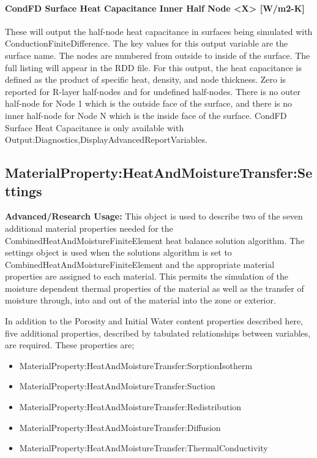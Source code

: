 \paragraph{CondFD Surface Heat Capacitance Inner Half Node \textless{}X\textgreater{} {[}W/m2-K{]}}\label{condfd-surface-heat-capacitance-inner-half-node-x-wm2-k}

These will output the half-node heat capacitance in surfaces being simulated with ConductionFiniteDifference. The key values for this output variable are the surface name. The nodes are numbered from outside to inside of the surface. The full listing will appear in the RDD file. For this output, the heat capacitance is defined as the product of specific heat, density, and node thickness. Zero is reported for R-layer half-nodes and for undefined half-nodes. There is no outer half-node for Node 1 which is the outside face of the surface, and there is no inner half-node for Node N which is the inside face of the surface. CondFD Surface Heat Capacitance is only available with Output:Diagnostics,DisplayAdvancedReportVariables.

\subsection{MaterialProperty:HeatAndMoistureTransfer:Settings}\label{materialpropertyheatandmoisturetransfersettings}

\textbf{Advanced/Research Usage:} This object is used to describe two of the seven additional material properties needed for the CombinedHeatAndMoistureFiniteElement heat balance solution algorithm. The settings object is used when the solutions algorithm is set to CombinedHeatAndMoistureFiniteElement and the appropriate material properties are assigned to each material. This permits the simulation of the moisture dependent thermal properties of the material as well as the transfer of moisture through, into and out of the material into the zone or exterior.

In addition to the Porosity and Initial Water content properties described here, five additional properties, described by tabulated relationships between variables, are required. These properties are;

\begin{itemize}
\item
  MaterialProperty:HeatAndMoistureTransfer:SorptionIsotherm
\item
  MaterialProperty:HeatAndMoistureTransfer:Suction
\item
  MaterialProperty:HeatAndMoistureTransfer:Redistribution
\item
  MaterialProperty:HeatAndMoistureTransfer:Diffusion
\item
  MaterialProperty:HeatAndMoistureTransfer:ThermalConductivity
\end{itemize}


